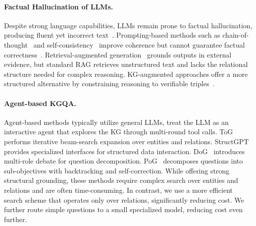 \documentclass[11pt]{article}
\begin{document}
\paragraph{Factual Hallucination of LLMs.}
Despite strong language capabilities, LLMs remain prone to factual hallucination, producing fluent yet incorrect text~\citep{ji-etal-2023-hallucination-survey,huang-etal-2025-hallucination-survey}. Prompting-based methods such as chain-of-thought~\citep{wei-etal-2022-cot} and self-consistency~\citep{wang-etal-2023-selfconsistency} improve coherence but cannot guarantee factual correctness~\citep{ye-durrett-2022-unreliability}. Retrieval-augmented generation~\citep{lewis-etal-2020-rag,gao-etal-2024-rag-survey} grounds outputs in external evidence, but standard RAG retrieves unstructured text and lacks the relational structure needed for complex reasoning. KG-augmented approaches offer a more structured alternative by constraining reasoning to verifiable triples~\citep{pan-etal-2024-kgllm-survey,agrawal-etal-2024-kg-hallucination}.

\paragraph{Agent-based KGQA.}
Agent-based methods typically utilize general LLMs, treat the LLM as an interactive agent that explores the KG through multi-round tool calls. ToG~\citep{sun2024think-on-graph} performs iterative beam-search expansion over entities and relations. StructGPT~\citep{jiang-etal-2023-structgpt} provides specialized interfaces for structured data interaction. DoG~\citep{ma2025debate} introduces multi-role debate for question decomposition. PoG~\citep{chen2024plan-on-graph} decomposes questions into sub-objectives with backtracking and self-correction. While offering strong structural grounding, these methods require complex search over entities and relations and are often time-consuming. In contrast, we use a more efficient search scheme that operates only over relations, significantly reducing cost. We further route simple questions to a small specialized model, reducing cost even further.
\end{document}
